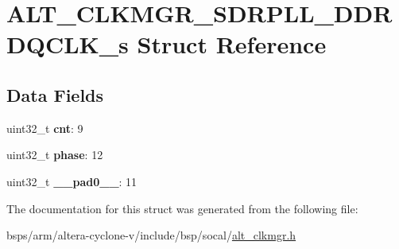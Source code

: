 \hypertarget{structALT__CLKMGR__SDRPLL__DDRDQCLK__s}{}\section{A\+L\+T\+\_\+\+C\+L\+K\+M\+G\+R\+\_\+\+S\+D\+R\+P\+L\+L\+\_\+\+D\+D\+R\+D\+Q\+C\+L\+K\+\_\+s Struct Reference}
\label{structALT__CLKMGR__SDRPLL__DDRDQCLK__s}
\subsection*{Data Fields}
\begin{DoxyCompactItemize}
\item 
\mbox{\label{structALT__CLKMGR__SDRPLL__DDRDQCLK__s_aaa22812ef928d3789bcdc8586078a3ac}} 
uint32\+\_\+t {\bfseries cnt}\+: 9
\item 
\mbox{\label{structALT__CLKMGR__SDRPLL__DDRDQCLK__s_a69ad71a81229759e5d9c0b81e40fd37c}} 
uint32\+\_\+t {\bfseries phase}\+: 12
\item 
\mbox{\label{structALT__CLKMGR__SDRPLL__DDRDQCLK__s_a98523f8ae6f826930430cd0e89fc33ba}} 
uint32\+\_\+t {\bfseries \+\_\+\+\_\+pad0\+\_\+\+\_\+}\+: 11
\end{DoxyCompactItemize}


The documentation for this struct was generated from the following file\+:\begin{DoxyCompactItemize}
\item 
bsps/arm/altera-\/cyclone-\/v/include/bsp/socal/\mbox{\hyperlink{alt__clkmgr_8h}{alt\+\_\+clkmgr.\+h}}\end{DoxyCompactItemize}
